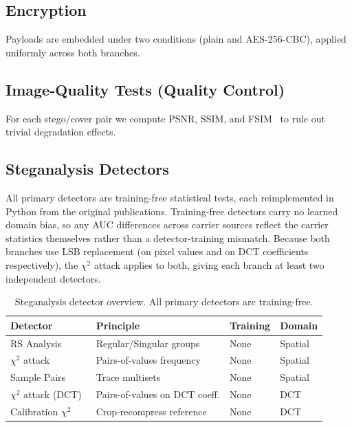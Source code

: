 \documentclass[10pt,twocolumn,a4paper]{article}
\begin{document}
\subsection{Encryption}

Payloads are embedded under two conditions (plain and AES-256-CBC), applied uniformly across both branches.

\subsection{Image-Quality Tests (Quality Control)}

For each stego/cover pair we compute PSNR, SSIM, and FSIM~\cite{zhang2011fsim} to rule out trivial degradation effects.

\subsection{Steganalysis Detectors}

All primary detectors are training-free statistical tests, each reimplemented in Python from the original publications. Training-free detectors carry no learned domain bias, so any AUC differences across carrier sources reflect the carrier statistics themselves rather than a detector-training mismatch. Because both branches use LSB replacement (on pixel values and on DCT coefficients respectively), the $\chi^2$ attack applies to both, giving each branch at least two independent detectors.

\begin{table}[h]
\centering
\caption{Steganalysis detector overview. All primary detectors are training-free.}
\label{tab:detectors}
\scriptsize
\setlength{\tabcolsep}{4pt}
\begin{tabular}{@{}llll@{}}
\toprule
\textbf{Detector} & \textbf{Principle} & \textbf{Training} & \textbf{Domain} \\
\midrule
RS Analysis~\cite{fridrich2001lsb} & Regular/Singular groups & None & Spatial \\
$\chi^2$ attack~\cite{westfeld1999chi} & Pairs-of-values frequency & None & Spatial \\
Sample Pairs~\cite{dumitrescu2003sp} & Trace multisets & None & Spatial \\
$\chi^2$ attack (DCT)~\cite{westfeld1999chi} & Pairs-of-values on DCT coeff. & None & DCT \\
Calibration $\chi^2$~\cite{fridrich2003calib} & Crop-recompress reference & None & DCT \\
\bottomrule
\end{tabular}
\end{table}
\end{document}
